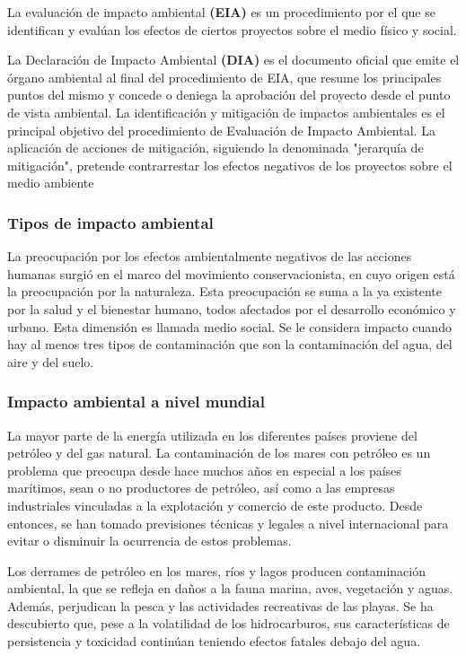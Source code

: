 La evaluación de impacto ambiental \textbf{(EIA)} es un procedimiento por el que se
identifican y evalúan los efectos de ciertos proyectos sobre el medio físico y social.

La Declaración de Impacto Ambiental \textbf{(DIA)} es el documento oficial que emite el órgano
ambiental al final del procedimiento de EIA, que resume los principales puntos del
mismo y concede o deniega la aprobación del proyecto desde el punto de vista
ambiental. La identificación y mitigación de impactos ambientales es el principal objetivo
del procedimiento de Evaluación de Impacto Ambiental. La aplicación de acciones de
mitigación, siguiendo la denominada "jerarquía de mitigación", pretende contrarrestar
los efectos negativos de los proyectos sobre el medio ambiente

\subsubsection{Tipos de impacto ambiental}

La preocupación por los efectos ambientalmente negativos de las acciones
humanas surgió en el marco del movimiento conservacionista, en cuyo origen está la
preocupación por la naturaleza. Esta preocupación se suma a la ya existente por la
salud y el bienestar humano, todos afectados por el desarrollo económico y urbano.
Esta dimensión es llamada medio social. Se le considera impacto cuando hay al menos
tres tipos de contaminación que son la contaminación del agua, del aire y del suelo.

\subsubsection{Impacto ambiental a nivel mundial}
La mayor parte de la energía utilizada en los diferentes países proviene
del petróleo y del gas natural. La contaminación de los mares con petróleo es un
problema que preocupa desde hace muchos años en especial a los países marítimos,
sean o no productores de petróleo, así como a las empresas industriales vinculadas a la
explotación y comercio de este producto. Desde entonces, se han tomado previsiones
técnicas y legales a nivel internacional para evitar o disminuir la ocurrencia de estos
problemas.

Los derrames de petróleo en los mares, ríos y lagos producen contaminación
ambiental, la que se refleja en daños a la fauna marina, aves, vegetación y aguas.
Además, perjudican la pesca y las actividades recreativas de las playas. Se ha
descubierto que, pese a la volatilidad de los hidrocarburos, sus características de
persistencia y toxicidad continúan teniendo efectos fatales debajo del agua.

